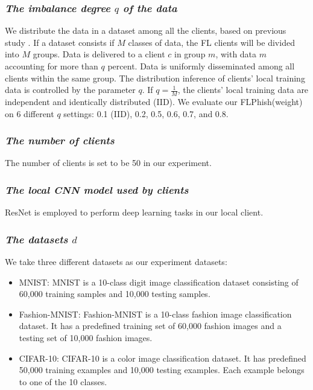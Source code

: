 \documentclass[journal]{IEEEtran}
\begin{document}
  \subsubsection{{\textit{The imbalance degree {$q$} of the data}}} We distribute the data in a dataset among all the clients, based on previous study \cite{ref_06_model}. If a dataset consists if $M$ classes of data, the FL clients will be divided into $M$ groups. Data is delivered to a client $c$ in group $m$, with data $m$ accounting for more than $q$ percent. Data is uniformly disseminated among all clients within the same group. The distribution inference of clients' local training data is controlled by the parameter $q$. If $q=\frac{1}{M}$, the clients' local training data are independent and identically distributed (IID). We evaluate our FLPhish(weight) on 6 different $q$ settings: 0.1 (IID), 0.2, 0.5, 0.6, 0.7, and 0.8.
  \subsubsection{{\textit{The number of clients}}} The number of clients is set to be 50 in our experiment.
  \subsubsection{{\textit{The local CNN model used by clients}}} ResNet is employed to perform deep learning tasks in our local client.
  \subsubsection{{\textit{The datasets {$d$}}}} We take three different datasets as our experiment datasets: \begin{itemize}
      \item MNIST: MNIST is a 10-class digit image classification dataset consisting of 60,000 training samples and 10,000 testing samples.
      \item Fashion-MNIST: Fashion-MNIST is a 10-class fashion image classification dataset. It has a predefined training set of 60,000 fashion images and a testing set of 10,000 fashion images.
      \item CIFAR-10: CIFAR-10 is a color image classification dataset. It has predefined 50,000 training examples and 10,000 testing examples. Each example belongs to one of the 10 classes.
  \end{itemize} 
\end{document}
